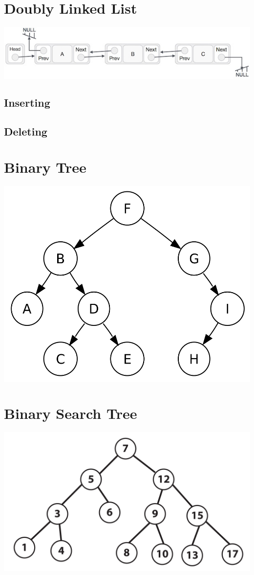 \documentclass[11pt]{article}
\begin{document}
\section{Doubly Linked List}
\begin{center}
    \includegraphics[width=350 px]{img/doublylinkedlist}  \\
\end{center}



\subsection{Inserting}



\subsection{Deleting}



\section{Binary Tree}
\begin{center}
    \includegraphics[width=250 px]{img/binarytree}  \\
\end{center}
\section{Binary Search Tree}
\begin{center}
    \includegraphics[width=250 px]{img/binarysearchtree}  \\
\end{center}
\end{document}
